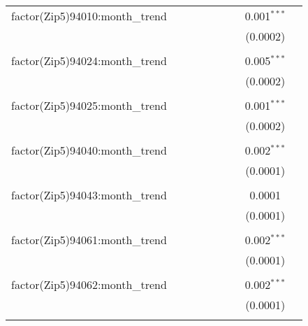 \begin{table}[H]
{\begin{tabular}{@{\extracolsep{5pt}}lcccccccc}
  factor(Zip5)94010:month\_trend &  &  &  &  &  &  & 0.001$^{***}$ &  \\  

   &  &  &  &  &  &  & (0.0002) &  \\  

   & & & & & & & & \\  

  factor(Zip5)94024:month\_trend &  &  &  &  &  &  & 0.005$^{***}$ &  \\  

   &  &  &  &  &  &  & (0.0002) &  \\  

   & & & & & & & & \\  

  factor(Zip5)94025:month\_trend &  &  &  &  &  &  & 0.001$^{***}$ &  \\  

   &  &  &  &  &  &  & (0.0002) &  \\  

   & & & & & & & & \\  

  factor(Zip5)94040:month\_trend &  &  &  &  &  &  & 0.002$^{***}$ &  \\  

   &  &  &  &  &  &  & (0.0001) &  \\  

   & & & & & & & & \\  

  factor(Zip5)94043:month\_trend &  &  &  &  &  &  & 0.0001 &  \\  

   &  &  &  &  &  &  & (0.0001) &  \\  

   & & & & & & & & \\  

  factor(Zip5)94061:month\_trend &  &  &  &  &  &  & 0.002$^{***}$ &  \\  

   &  &  &  &  &  &  & (0.0001) &  \\  

   & & & & & & & & \\  

  factor(Zip5)94062:month\_trend &  &  &  &  &  &  & 0.002$^{***}$ &  \\  

   &  &  &  &  &  &  & (0.0001) &  \\  

   & & & & & & & & \\  


\end{tabular}}
\end{table}

